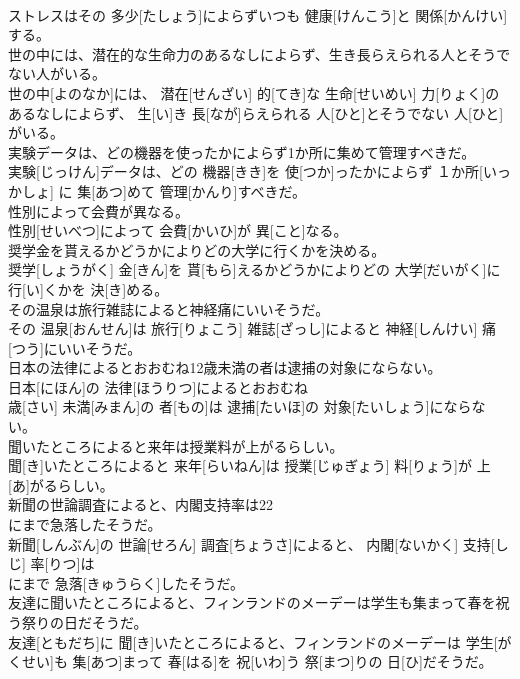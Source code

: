\documentclass[8pt]{extreport}
\begin{document}
\begin{CJK}{UTF8}{min}
\\	ストレスはその 多少[たしょう]によらずいつも 健康[けんこう]と 関係[かんけい]する。
\\	世の中には、潜在的な生命力のあるなしによらず、生き長らえられる人とそうでない人がいる。	
\\	世の中[よのなか]には、 潜在[せんざい] 的[てき]な 生命[せいめい] 力[りょく]のあるなしによらず、 生[い]き 長[なが]らえられる 人[ひと]とそうでない 人[ひと]がいる。
\\	実験データは、どの機器を使ったかによらず1か所に集めて管理すべきだ。	
\\	実験[じっけん]データは、どの 機器[きき]を 使[つか]ったかによらず １か所[いっかしょ] に 集[あつ]めて 管理[かんり]すべきだ。
\\	性別によって会費が異なる。	
\\	性別[せいべつ]によって 会費[かいひ]が 異[こと]なる。
\\	奨学金を貰えるかどうかによりどの大学に行くかを決める。	
\\	奨学[しょうがく] 金[きん]を 貰[もら]えるかどうかによりどの 大学[だいがく]に 行[い]くかを 決[き]める。
\\	その温泉は旅行雑誌によると神経痛にいいそうだ。	
\\	その 温泉[おんせん]は 旅行[りょこう] 雑誌[ざっし]によると 神経[しんけい] 痛[つう]にいいそうだ。
\\	日本の法律によるとおおむね12歳未満の者は逮捕の対象にならない。	
\\	日本[にほん]の 法律[ほうりつ]によるとおおむね 
\\	歳[さい] 未満[みまん]の 者[もの]は 逮捕[たいほ]の 対象[たいしょう]にならない。
\\	聞いたところによると来年は授業料が上がるらしい。	
\\	聞[き]いたところによると 来年[らいねん]は 授業[じゅぎょう] 料[りょう]が 上[あ]がるらしい。
\\	新聞の世論調査によると、内閣支持率は22
\\	にまで急落したそうだ。	
\\	新聞[しんぶん]の 世論[せろん] 調査[ちょうさ]によると、 内閣[ないかく] 支持[しじ] 率[りつ]は 
\\	にまで 急落[きゅうらく]したそうだ。
\\	友達に聞いたところによると、フィンランドのメーデーは学生も集まって春を祝う祭りの日だそうだ。	
\\	友達[ともだち]に 聞[き]いたところによると、フィンランドのメーデーは 学生[がくせい]も 集[あつ]まって 春[はる]を 祝[いわ]う 祭[まつ]りの 日[ひ]だそうだ。

\end{CJK}
\end{document}
